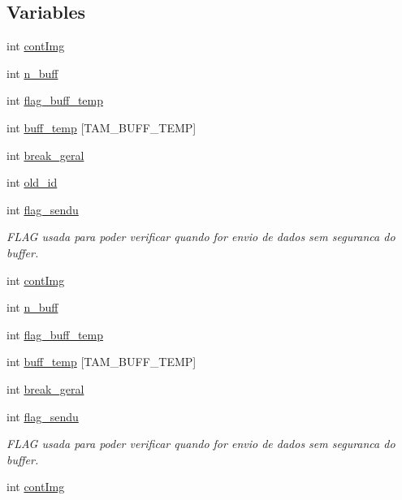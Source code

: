 \subsection*{Variables}
\begin{DoxyCompactItemize}
\item 
int \hyperlink{group__SFTD_ga46b780fcc31527f9e6b9b94b27c5fdc9}{contImg}
\item 
int \hyperlink{group__SFTD_gaeed3ab3cfaa81fc518da034ffff8576c}{n\_\-buff}
\item 
int \hyperlink{group__SFTD_gab01f6df89a2c590dbf207e6e2ce01bf2}{flag\_\-buff\_\-temp}
\item 
int \hyperlink{group__SFTD_gaf04e37b7953920f8142c8ebf2b9f7d13}{buff\_\-temp} \mbox{[}TAM\_\-BUFF\_\-TEMP\mbox{]}
\item 
int \hyperlink{group__SFTD_gadd34d8f0c83196f8b20622a06ddead79}{break\_\-geral}
\item 
int \hyperlink{group__SFTD_ga64595c5b8b55f94d3eb7503f07bc61a9}{old\_\-id}
\item 
int \hyperlink{group__SFTD_ga2154b2a39f2c03e7fd41ea4c626dfefc}{flag\_\-sendu}
\begin{DoxyCompactList}\small\item\em FLAG usada para poder verificar quando for envio de dados sem seguranca do buffer. \item\end{DoxyCompactList}\item 
int \hyperlink{group__SFTD_ga46b780fcc31527f9e6b9b94b27c5fdc9}{contImg}
\item 
int \hyperlink{group__SFTD_gaeed3ab3cfaa81fc518da034ffff8576c}{n\_\-buff}
\item 
int \hyperlink{group__SFTD_gab01f6df89a2c590dbf207e6e2ce01bf2}{flag\_\-buff\_\-temp}
\item 
int \hyperlink{group__SFTD_gaf04e37b7953920f8142c8ebf2b9f7d13}{buff\_\-temp} \mbox{[}TAM\_\-BUFF\_\-TEMP\mbox{]}
\item 
int \hyperlink{group__SFTD_gadd34d8f0c83196f8b20622a06ddead79}{break\_\-geral}
\item 
int \hyperlink{group__SFTD_ga2154b2a39f2c03e7fd41ea4c626dfefc}{flag\_\-sendu}
\begin{DoxyCompactList}\small\item\em FLAG usada para poder verificar quando for envio de dados sem seguranca do buffer. \item\end{DoxyCompactList}\item 
int \hyperlink{group__SFTD_ga46b780fcc31527f9e6b9b94b27c5fdc9}{contImg}

\end{DoxyCompactItemize}
